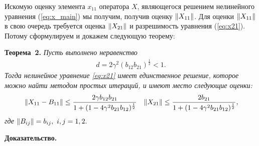 Искомую оценку элемента $x_{11}$ оператора $X$, являющегося решением нелинейного уравнения (\ref{eq:x_main}) мы получим, получив оценку $\left\|X_{11}\right\|$. Для оценки $\left\|X_{11}\right\|$ в свою очередь требуется оценка $\left\|X_{21}\right\|$ и разрешимость уравнения (\ref{eq:x21}). Потому сформулируем и докажем следующую теорему:

\noindent\textbf{Теорема~2.}
{ \it Пусть выполнено неравенство
\begin{align}
d = 2\gamma^2 (b_{12}b_{21})^{\frac{1}{2}} < 1. \label{coef}
\end{align}
Тогда нелинейное уравнение \eqref{eq:x21} имеет единственное решение, которое можно найти методом простых итераций, и имеют место следующие оценки:
\begin{align*}
&\left\|X_{11} - B_{11}\right\| \leq \frac{2\gamma b_{12}b_{21}}{1 + (1 - 4\gamma^2 b_{21}b_{12})^{\frac{1}{2}}}
&\left\|X_{21}\right\| \leq \frac{2b_{21}}{1 + (1 - 4\gamma^2 b_{21}b_{12})^{\frac{1}{2}}},
\end{align*}
где $\left\|B_{ij}\right\| = b_{ij},\ i,j = 1,2.$}

\noindent\textbf{Доказательство.}

